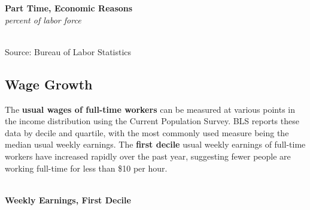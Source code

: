 \documentclass{report}
\makeatletter
\newcommand{\tbllink}[1]{\href{https://raw.githubusercontent.com/bdecon/US-chartbook/master/chartbook/data/#1}{\faTable}}
\newcommand*\short[1]{\expandafter\@gobbletwo\number\numexpr#1\relax}
\newcommand{\shdateaxisticks}{
		date coordinates in=x, axis line style={draw=none},
		xmax={2021-02-01},
		max space between ticks=40,	    
		xtick={{1990-01-01}, {1995-01-01}, {2000-01-01}, 
			{2005-01-01}, {2010-01-01}, {2015-01-01}, {2020-01-01}},
		minor xtick={},
		enlarge y limits={0.06}, enlarge x limits={0.01},
		}
\newcommand{\stdline}[4]{\addplot[very thick, no markers, color=#1] 
		table [x=#2, y=#3, col sep=comma] {#4};	}
\newcommand{\rbars}{
		\fill[color=black!10] (axis cs:{1990-07-01},\pgfkeysvalueof{/pgfplots/ymin}) rectangle 
			(axis cs:{1991-03-01}, \pgfkeysvalueof{/pgfplots/ymax});
		\fill[color=black!10] (axis cs:{2007-12-01},\pgfkeysvalueof{/pgfplots/ymin}) rectangle 
			(axis cs:{2009-07-01}, \pgfkeysvalueof{/pgfplots/ymax});
		\fill[color=black!10] (axis cs:{2001-03-01},\pgfkeysvalueof{/pgfplots/ymin}) rectangle 
			(axis cs:{2001-11-01}, \pgfkeysvalueof{/pgfplots/ymax});}
\makeatother
\begin{document}
{{{{{{{{{\begin{minipage}{0.42\textwidth}
\noindent \normalsize \textbf{Part Time, Economic Reasons}\\
\footnotesize{\textit{percent of labor force}}\\
\noindent \hspace*{-2mm} \\
\footnotesize{Source: Bureau of Labor Statistics} \hspace{14mm} \tbllink{ptecon.csv} 
\end{minipage}
\hspace{6.mm}
\begin{minipage}{0.29\textwidth}
\small 
\end{minipage}



\newpage

\begin{minipage}{0.76\textwidth}

\subsection*{\color{black!70} \seriffont Wage Growth}

\small The \textbf{usual wages of full-time workers} can be measured at various points in the income distribution using the Current Population Survey. BLS reports these data by decile and quartile, with the most commonly used measure being the median usual weekly earnings. The \textbf{first decile} usual weekly earnings of full-time workers have increased rapidly over the past year, suggesting fewer people are working full-time for less than \$10 per hour.\\

\\

\vspace{2mm}

\noindent \normalsize \textbf{Weekly Earnings, First Decile} 


\end{minipage}}}}}}}}}}
\end{document}
